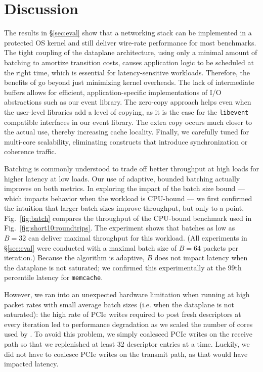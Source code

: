 
\section{Discussion}
\label{sec:disc}


 The results in \S\ref{sec:eval}
show that a networking stack can be implemented in a protected OS
kernel and still deliver wire-rate performance for most benchmarks.
The tight coupling of the dataplane architecture, using only a minimal
amount of batching to amortize transition costs, causes application
logic to be scheduled at the right time, which is essential for
latency-sensitive workloads.  Therefore, the benefits of \ix go beyond
just minimizing kernel overheads. The lack of intermediate buffers
allows for efficient, application-specific implementations of I/O
abstractions such as our event library. The zero-copy approach helps
even when the user-level libraries add a level of copying, as it is
the case for the \texttt{libevent} compatible interfaces in our event
library.  The extra copy occurs much closer to the actual use, thereby
increasing cache locality.  Finally, we carefully tuned \ix for
multi-core scalability, eliminating constructs that introduce
synchronization or coherence traffic.




Batching is commonly understood to trade off better throughput at high
loads for higher latency at low loads.  Our use of adaptive, bounded
batching actually improves on both metrics. In exploring the impact of
the batch size bound --- which impacts behavior when the workload is
CPU-bound --- we first confirmed the intuition that larger batch
sizes improve throughput, but only to a point. Fig.~\ref{fig:batch}
compares the throughput of the CPU-bound benchmark used in
Fig.~\ref{fig:short10:roundtrips}.  The experiment shows that batches
as low as $B=32$ can deliver maximal throughput for this
workload. (All experiments in \S\ref{sec:eval} were conducted with a
maximal batch size of $B=64$ packets per iteration.)  Because the
algorithm is adaptive, $B$ does not impact latency when the dataplane
is not saturated; we confirmed
this experimentally at the 99th percentile latency for
\texttt{memcache}.

However, we ran into an unexpected hardware limitation
when running \ix at high packet rates with small average batch sizes 
(i.e. when the dataplane is not saturated): 
the high rate of PCIe writes required to post fresh
descriptors at every iteration led to performance degradation as we
scaled the number of cores used by \ix.  To avoid this problem, we
simply coalesced PCIe writes on the receive path so that we
replenished at least 32 descriptor entries at a time.  Luckily, we did
not have to coalesce PCIe writes on the transmit path, as that would
have impacted latency.


